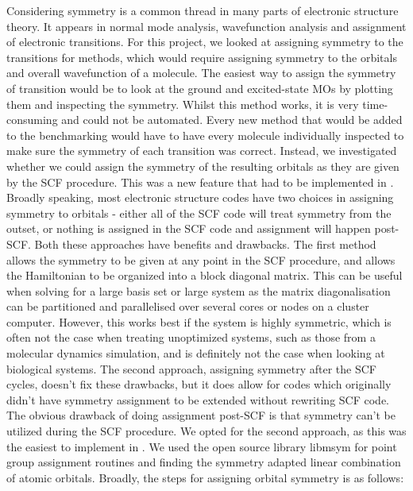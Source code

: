 Considering symmetry is a common thread in many parts of electronic structure 
theory. It appears in normal mode analysis, wavefunction analysis and assignment
of electronic transitions. For this project, we looked at assigning symmetry to 
the transitions for \dscf methods, which would require assigning symmetry to the
orbitals and overall wavefunction of a molecule.
The easiest way to assign the symmetry of transition would be to look at the
ground and excited-state MOs by plotting them and inspecting the symmetry. Whilst
this method works, it is very time-consuming and could not be automated. Every new
method that would be added to the benchmarking would have to have every molecule
individually inspected to make sure the symmetry of each transition was correct.
Instead, we investigated whether we could assign the symmetry of the resulting 
orbitals as they are given by the SCF procedure. This was a new feature that had
to be implemented in .
Broadly speaking, most electronic structure codes have two choices in assigning
symmetry to orbitals - either all of the SCF code will treat symmetry from the 
outset, or nothing is assigned in the SCF code and assignment will happen post-SCF.
Both these approaches have benefits and drawbacks. The first method allows the 
symmetry to be given at any point in the SCF procedure, and allows the Hamiltonian
to be organized into a block diagonal matrix. This can be useful when solving
for a large basis set or large system as the matrix diagonalisation can be
partitioned and parallelised over several cores or nodes on a cluster computer.
However, this works best if the system is highly symmetric, which is often not
the case when treating unoptimized systems, such as those from a molecular dynamics
simulation, and is definitely not the case when looking at biological systems.
The second approach, assigning symmetry after the SCF cycles, doesn't fix these
drawbacks, but it does allow for codes which originally didn't have symmetry
assignment to be extended without rewriting SCF code. The obvious drawback of
doing assignment post-SCF is that symmetry can't be utilized during the SCF procedure.
We opted for the second approach, as this was the easiest to implement in .
We used the open source library libmsym for point group assignment routines and finding
the symmetry adapted linear combination of atomic orbitals. Broadly, the steps
for assigning orbital symmetry is as follows:

